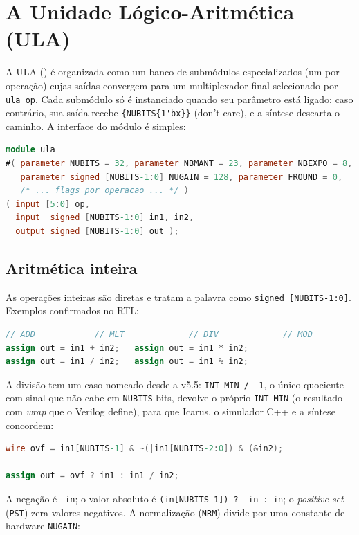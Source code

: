 \section{A Unidade Lógico-Aritmética (ULA)}
\label{sec:arq-ula}

A ULA () é organizada como um banco de submódulos especializados (um por
operação) cujas saídas convergem para um multiplexador final selecionado por
\lstinline|ula_op|. Cada submódulo só é instanciado quando seu parâmetro está ligado; caso
contrário, sua saída recebe \lstinline|{NUBITS{1'bx}}| (don't-care), e a síntese descarta o
caminho. A interface do módulo é simples:

\begin{lstlisting}[language=Verilog]
module ula
#( parameter NUBITS = 32, parameter NBMANT = 23, parameter NBEXPO = 8,
   parameter signed [NUBITS-1:0] NUGAIN = 128, parameter FROUND = 0,
   /* ... flags por operacao ... */ )
( input [5:0] op,
  input  signed [NUBITS-1:0] in1, in2,
  output signed [NUBITS-1:0] out );
\end{lstlisting}

\subsection{Aritmética inteira}
\label{sec:arq-ula-int}

As operações inteiras são diretas e tratam a palavra como \lstinline|signed [NUBITS-1:0]|.
Exemplos confirmados no RTL:

\begin{lstlisting}[language=Verilog]
// ADD            // MLT             // DIV             // MOD
assign out = in1 + in2;   assign out = in1 * in2;
assign out = in1 / in2;   assign out = in1 % in2;
\end{lstlisting}

A divisão tem um caso nomeado desde a v5.5: \lstinline|INT_MIN / -1|, o único quociente com sinal
que não cabe em \lstinline|NUBITS| bits, devolve o próprio \lstinline|INT_MIN| (o resultado
com \emph{wrap} que o Verilog define), para que Icarus, o simulador C++ e a síntese
concordem:

\begin{lstlisting}[language=Verilog]
wire ovf = in1[NUBITS-1] & ~(|in1[NUBITS-2:0]) & (&in2);

assign out = ovf ? in1 : in1 / in2;
\end{lstlisting}

A negação é \lstinline|-in|; o valor absoluto é \lstinline|(in[NUBITS-1]) ? -in : in|; o
\emph{positive set} (\lstinline|PST|) zera valores negativos. A normalização (\lstinline|NRM|)
divide por uma constante de hardware \lstinline|NUGAIN|:

